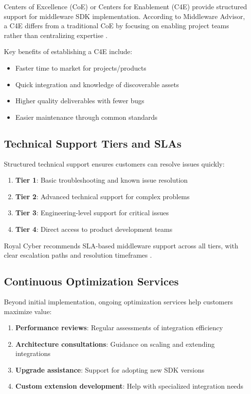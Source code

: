 \documentclass[11pt,a4paper]{article}
\begin{document}
Centers of Excellence (CoE) or Centers for Enablement (C4E) provide structured support for middleware SDK implementation. According to Middleware Advisor, a C4E differs from a traditional CoE by focusing on enabling project teams rather than centralizing expertise \cite{middlewareadvisor2023}.

Key benefits of establishing a C4E include:
\begin{itemize}
    \item Faster time to market for projects/products
    \item Quick integration and knowledge of discoverable assets
    \item Higher quality deliverables with fewer bugs
    \item Easier maintenance through common standards
\end{itemize}

\subsection{Technical Support Tiers and SLAs}

Structured technical support ensures customers can resolve issues quickly:

\begin{enumerate}
    \item \textbf{Tier 1}: Basic troubleshooting and known issue resolution
    \item \textbf{Tier 2}: Advanced technical support for complex problems
    \item \textbf{Tier 3}: Engineering-level support for critical issues
    \item \textbf{Tier 4}: Direct access to product development teams
\end{enumerate}

Royal Cyber recommends SLA-based middleware support across all tiers, with clear escalation paths and resolution timeframes \cite{royalcyber2023}.

\subsection{Continuous Optimization Services}

Beyond initial implementation, ongoing optimization services help customers maximize value:

\begin{enumerate}
    \item \textbf{Performance reviews}: Regular assessments of integration efficiency
    \item \textbf{Architecture consultations}: Guidance on scaling and extending integrations
    \item \textbf{Upgrade assistance}: Support for adopting new SDK versions
    \item \textbf{Custom extension development}: Help with specialized integration needs
\end{enumerate}
\end{document}

